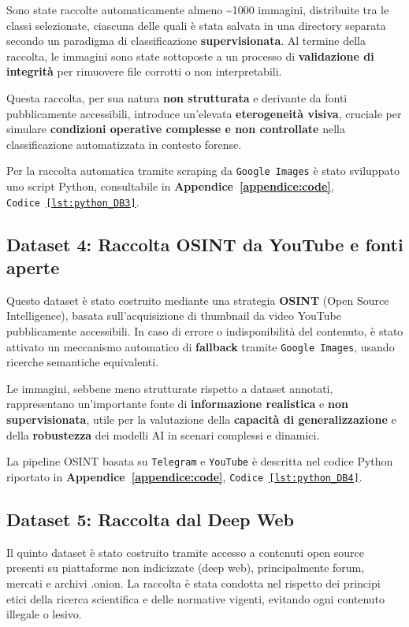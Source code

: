 Sono state raccolte automaticamente almeno \textasciitilde1000 immagini, distribuite tra le classi selezionate, ciascuna delle quali è stata salvata in una directory separata secondo un paradigma di classificazione \textbf{supervisionata}. Al termine della raccolta, le immagini sono state sottoposte a un processo di \textbf{validazione di integrità} per rimuovere file corrotti o non interpretabili.

Questa raccolta, per sua natura \textbf{non strutturata} e derivante da fonti pubblicamente accessibili, introduce un’elevata \textbf{eterogeneità visiva}, cruciale per simulare \textbf{condizioni operative complesse e non controllate} nella classificazione automatizzata in contesto forense.

Per la raccolta automatica tramite scraping da \texttt{Google Images} è stato sviluppato uno script Python, consultabile in \textbf{Appendice~\ref{appendice:code}}, \texttt{Codice~\ref{lst:python_DB3}}.





\subsection*{Dataset 4: Raccolta OSINT da YouTube e fonti aperte}
Questo dataset è stato costruito mediante una strategia \textbf{OSINT} (Open Source Intelligence), basata sull’acquisizione di thumbnail da video YouTube pubblicamente accessibili. In caso di errore o indisponibilità del contenuto, è stato attivato un meccanismo automatico di \textbf{fallback} tramite \texttt{Google Images}, usando ricerche semantiche equivalenti.

Le immagini, sebbene meno strutturate rispetto a dataset annotati, rappresentano un’importante fonte di \textbf{informazione realistica} e \textbf{non supervisionata}, utile per la valutazione della \textbf{capacità di generalizzazione} e della \textbf{robustezza} dei modelli AI in scenari complessi e dinamici.

La pipeline OSINT basata su \texttt{Telegram} e \texttt{YouTube} è descritta nel codice Python riportato in \textbf{Appendice~\ref{appendice:code}}, \texttt{Codice~\ref{lst:python_DB4}}.





\subsection*{Dataset 5: Raccolta dal Deep Web}
Il quinto dataset è stato costruito tramite accesso a contenuti open source presenti su piattaforme non indicizzate (deep web), principalmente forum, mercati e archivi .onion. La raccolta è stata condotta nel rispetto dei principi etici della ricerca scientifica e delle normative vigenti, evitando ogni contenuto illegale o lesivo.

